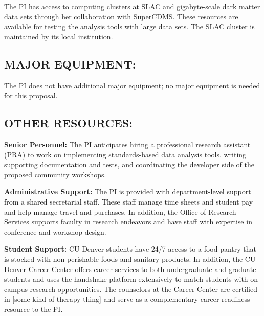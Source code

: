 \documentclass[11pt]{article}
\def\ni{\noindent}
\def\bs{\bigskip}
\newcommand{\NEXUS}{{\small NEXUS}}
\newcommand{\CDMS}{{\small CDMS}}
\begin{document}
\bs
\ni {\bf Other Facilities:}
\ni
The PI has access to computing clusters at SLAC and gigabyte-scale dark matter data sets through her collaboration with SuperCDMS.  These resources are available for testing the analysis tools with large data sets.  The SLAC cluster is maintained by its local institution. 

\subsection*{\small MAJOR EQUIPMENT:}

The PI does not have additional major equipment; no major equipment is needed for this proposal.

\bs
\subsection*{\small OTHER RESOURCES:}

\ni
{\bf Senior Personnel:} The PI anticipates hiring a professional research assistant (PRA) to work on implementing standards-based data analysis tools, writing supporting documentation and tests, and coordinating the developer side of the proposed community workshops.  %

{\bf Administrative Support:}  The PI is provided with department-level support from a shared secretarial staff.  These staff manage time sheets and student pay and help manage travel and purchases.  In addition, the Office of Research Services supports faculty in research endeavors and have staff with expertise in conference and workshop design.   

{\bf Student Support:}  CU Denver students have 24/7 access to a food pantry that is stocked with non-perishable foods and sanitary products.  In addition, the CU Denver Career Center offers career services to both undergraduate and graduate students and uses the handshake platform extensively to match students with on-campus research opportunities.  The counselors at the Career Center are certified in [some kind of therapy thing] and serve as a complementary career-readiness resource to the PI.




\end{document}

